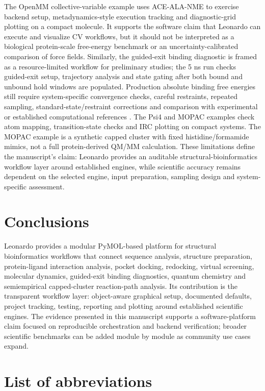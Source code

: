 \documentclass[pdflatex,sn-vancouver-num]{sn-jnl}
\begin{document}
The OpenMM collective-variable example uses ACE-ALA-NME to exercise backend setup, metadynamics-style execution tracking and diagnostic-grid plotting on a compact molecule.  It supports the software claim that Leonardo can execute and visualize CV workflows, but it should not be interpreted as a biological protein-scale free-energy benchmark or an uncertainty-calibrated comparison of force fields.  Similarly, the guided-exit binding diagnostic is framed as a resource-limited workflow for preliminary studies; the 5 ns run checks guided-exit setup, trajectory analysis and state gating after both bound and unbound hold windows are populated.  Production absolute binding free energies still require system-specific convergence checks, careful restraints, repeated sampling, standard-state/restraint corrections and comparison with experimental or established computational references \cite{boresch_abfe2003,mey_alchemical2020}.  The Psi4 and MOPAC examples check atom mapping, transition-state checks and IRC plotting on compact systems.  The MOPAC example is a synthetic capped cluster with fixed histidine/formamide mimics, not a full protein-derived QM/MM calculation.  These limitations define the manuscript's claim: Leonardo provides an auditable structural-bioinformatics workflow layer around established engines, while scientific accuracy remains dependent on the selected engine, input preparation, sampling design and system-specific assessment.

\section{Conclusions}\label{sec:conclusions}

Leonardo provides a modular PyMOL-based platform for structural bioinformatics workflows that connect sequence analysis, structure preparation, protein-ligand interaction analysis, pocket docking, redocking, virtual screening, molecular dynamics, guided-exit binding diagnostics, quantum chemistry and semiempirical capped-cluster reaction-path analysis.  Its contribution is the transparent workflow layer: object-aware graphical setup, documented defaults, project tracking, testing, reporting and plotting around established scientific engines.  The evidence presented in this manuscript supports a software-platform claim focused on reproducible orchestration and backend verification; broader scientific benchmarks can be added module by module as community use cases expand.

\section*{List of abbreviations}
\end{document}

